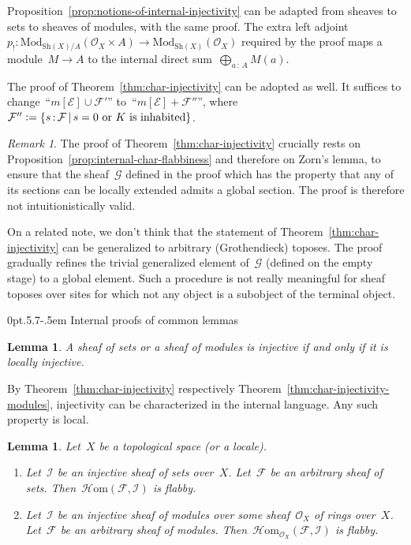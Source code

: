 \documentclass[10pt,reqno,a4paper]{amsbook}
\makeatletter
\theoremstyle{definition}
\theoremstyle{plain}
\newtheorem{lemma}[defn]{Lemma}
\theoremstyle{remark}
\newtheorem{rem}[defn]{Remark}
\newcommand{\E}{\mathcal{E}}
\newcommand{\F}{\mathcal{F}}
\renewcommand{\G}{\mathcal{G}}
\renewcommand{\O}{\mathcal{O}}
\newcommand{\I}{\mathcal{I}}
\newcommand{\HOM}{\mathcal{H}\mathrm{om}}
\newcommand{\Sh}{\mathrm{Sh}}
\newcommand{\Mod}{\mathrm{Mod}}
\newcommand{\?}{\,{:}\,}
\renewcommand{\_}{\mathpunct{.}\,}
\newcommand{\defeq}{\vcentcolon=}
\renewenvironment{proof}[1][\proofname]{\par
  \pushQED{\qed}%
  \normalfont \topsep6\p@\@plus6\p@\relax
  \trivlist
  \item[\hskip\labelsep
        \itshape
    #1\@addpunct{.}]\ignorespaces
}{%
  \popQED\endtrivlist\@endpefalse
}
\def\subsection{\@startsection{subsection}{2}%
  {0pt}{.5\linespacing\@plus.7\linespacing}{-.5em}%
  {\normalfont\bfseries}}
\makeatother
\begin{document}
\begin{proof}Proposition~\ref{prop:notions-of-internal-injectivity} can be
adapted from sheaves to sets to sheaves of modules, with the same proof.
The extra left adjoint~$p_! : \Mod_{\Sh(X)/A}(\O_X \times A) \to
\Mod_{\Sh(X)}(\O_X)$ required by the proof maps a module~$M \to A$ to the
internal direct sum~$\bigoplus_{a \? A} M(a)$.

The proof of Theorem~\ref{thm:char-injectivity} can be adopted as well.
It suffices to change~``$m[\E] \cup \F'$'' to~``$m[\E] + \F''$'', where~$\F''
\defeq \{ s \? \F \,|\, \text{$s = 0$ or $K$ is inhabited} \}$.
\end{proof}

\begin{rem}The proof of Theorem~\ref{thm:char-injectivity} crucially rests on
Proposition~\ref{prop:internal-char-flabbiness} and therefore on Zorn's lemma,
to ensure that the sheaf~$\G$ defined in the proof which has the property that
any of its sections can be locally extended admits a global section. The proof
is therefore not intuitionistically valid.

On a related note, we don't think that the statement of
Theorem~\ref{thm:char-injectivity} can be generalized to arbitrary
(Grothendieck) toposes. The proof gradually refines the trivial
generalized element of~$\G$ (defined on the empty stage) to a global element.
Such a procedure is not really meaningful for sheaf toposes over sites for
which not any object is a subobject of the terminal object.
\end{rem}


\subsection{Internal proofs of common lemmas}

\begin{lemma}A sheaf of sets or a sheaf of modules is injective if and only if it
is locally injective.\end{lemma}

\begin{proof}By Theorem~\ref{thm:char-injectivity} respectively
Theorem~\ref{thm:char-injectivity-modules}, injectivity can be characterized in the
internal language. Any such property is local.\end{proof}

\begin{lemma}Let~$X$ be a topological space (or a locale).
\begin{enumerate}
\item Let~$\I$ be an injective sheaf of sets over~$X$. Let~$\F$ be an arbitrary
sheaf of sets. Then~$\HOM(\F,\I)$ is flabby.
\item Let~$\I$ be an injective sheaf of modules over some sheaf~$\O_X$ of rings
over~$X$. Let~$\F$ be an arbitrary sheaf of modules.
Then~$\HOM_{\O_X}(\F,\I)$ is flabby.
\end{enumerate}
\end{lemma}
\end{document}
